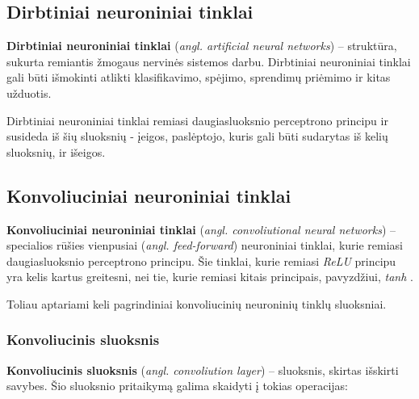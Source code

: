 \documentclass{VUMIFPSbakalaurinis}
\begin{document}
\subsection{Dirbtiniai neuroniniai tinklai}
\textbf{Dirbtiniai neuroniniai tinklai} (\textit{angl. artificial neural networks}) – struktūra, sukurta remiantis žmogaus nervinės sistemos darbu. Dirbtiniai neuroniniai tinklai gali būti išmokinti atlikti klasifikavimo, spėjimo, sprendimų priėmimo ir kitas užduotis.


Dirbtiniai neuroniniai tinklai remiasi daugiasluoksnio perceptrono principu ir susideda iš šių sluoksnių - įeigos, paslėptojo, kuris gali būti sudarytas iš kelių sluoksnių, ir išeigos.

\subsection{Konvoliuciniai neuroniniai tinklai}

\textbf{Konvoliuciniai neuroniniai tinklai} (\textit{angl. convoliutional neural networks}) – specialios rūšies vienpusiai (\textit{angl. feed-forward}) neuroniniai tinklai, kurie remiasi daugiasluoksnio perceptrono principu. Šie tinklai, kurie remiasi \textit{ReLU} principu yra kelis kartus greitesni, nei tie, kurie remiasi kitais principais, pavyzdžiui, \textit{tanh} \cite{NIPS2012_4824}. 

Toliau aptariami keli pagrindiniai konvoliucinių neuroninių tinklų sluoksniai.

\subsubsection{Konvoliucinis sluoksnis}

\textbf{Konvoliucinis sluoksnis} (\textit{angl. convoliution layer}) – sluoksnis, skirtas išskirti savybes. Šio sluoksnio 
pritaikymą galima skaidyti į tokias operacijas:
\end{document}
